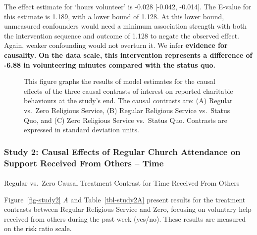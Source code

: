 \documentclass[
  single column]{article}
\makeatletter
\let\oldparagraph\paragraph
\renewcommand{\paragraph}{
    \@ifstar
      \xxxParagraphStar
      \xxxParagraphNoStar
  }
\newcommand{\xxxParagraphStar}[1]{\oldparagraph*{#1}\mbox{}}
\newcommand{\xxxParagraphNoStar}[1]{\oldparagraph{#1}\mbox{}}
\makeatother
\begin{document}
The effect estimate for `hours volunteer' is -0.028 {[}-0.042,
-0.014{]}. The E-value for this estimate is 1.189, with a lower bound of
1.128. At this lower bound, unmeasured confounders would need a minimum
association strength with both the intervention sequence and outcome of
1.128 to negate the observed effect. Again, weaker confounding would not
overturn it. We infer \textbf{evidence for causality}. \textbf{On the
data scale, this intervention represents a difference of -6.88 in
volunteering minutes compared with the status quo.}

\begin{figure}


\caption{\label{fig-1_1}This figure graphs the results of model
estimates for the causal effects of the three causal contrasts of
interest on reported charitable behaviours at the study's end. The
causal contrasts are: (A) Regular vs.~Zero Religious Service, (B)
Regular Religious Service vs.~Status Quo, and (C) Zero Religious Service
vs.~Status Quo. Contrasts are expressed in standard deviation units.}

\end{figure}%

\newpage{}

\subsubsection{Study 2: Causal Effects of Regular Church Attendance on
Support Received From Others --
Time}\label{study-2-causal-effects-of-regular-church-attendance-on-support-received-from-others-time}

\paragraph{Regular vs.~Zero Causal Treatment Contrast for Time Received
From
Others}\label{regular-vs.-zero-causal-treatment-contrast-for-time-received-from-others}

Figure~\ref{fig-study2} \emph{A} and Table~\ref{tbl-study2A} present
results for the treatment contrasts between Regular Religious Service
and Zero, focusing on voluntary help received from others during the
past week (yes/no). These results are measured on the risk ratio scale.
\end{document}
